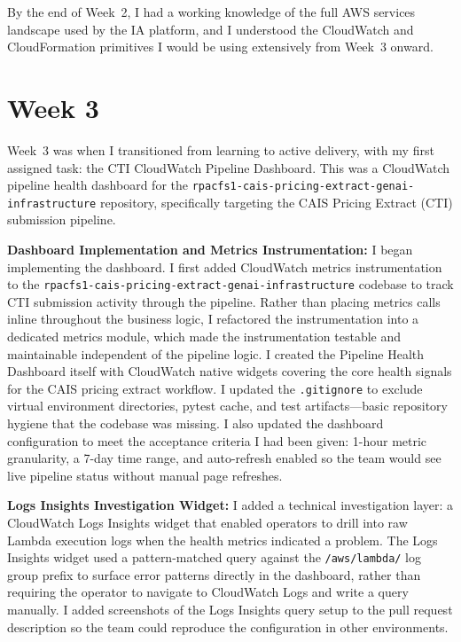 By the end of Week~2, I had a working knowledge of the full AWS services landscape used by the IA platform, and I understood the CloudWatch and CloudFormation primitives I would be using extensively from Week~3 onward.


\FloatBarrier

\section{Week 3}
\label{sec:week3}

Week~3 was when I transitioned from learning to active delivery, with my first assigned task: the CTI CloudWatch Pipeline Dashboard. This was a CloudWatch pipeline health dashboard for the \texttt{rpacfs1-cais-pricing-\allowbreak{}extract-genai-infrastructure} repository, specifically targeting the CAIS Pricing Extract (CTI) submission pipeline.

\textbf{Dashboard Implementation and Metrics Instrumentation:}
I began implementing the dashboard. I first added CloudWatch metrics instrumentation to the \texttt{rpacfs1-cais-pricing-\allowbreak{}extract-genai-infrastructure} codebase to track CTI submission activity through the pipeline. Rather than placing metrics calls inline throughout the business logic, I refactored the instrumentation into a dedicated metrics module, which made the instrumentation testable and maintainable independent of the pipeline logic. I created the Pipeline Health Dashboard itself with CloudWatch native widgets covering the core health signals for the CAIS pricing extract workflow. I updated the \texttt{.gitignore} to exclude virtual environment directories, pytest cache, and test artifacts---basic repository hygiene that the codebase was missing. I also updated the dashboard configuration to meet the acceptance criteria I had been given: 1-hour metric granularity, a 7-day time range, and auto-refresh enabled so the team would see live pipeline status without manual page refreshes.

\textbf{Logs Insights Investigation Widget:}
I added a technical investigation layer: a CloudWatch Logs Insights widget that enabled operators to drill into raw Lambda execution logs when the health metrics indicated a problem. The Logs Insights widget used a pattern-matched query against the \texttt{/aws/lambda/} log group prefix to surface error patterns directly in the dashboard, rather than requiring the operator to navigate to CloudWatch Logs and write a query manually. I added screenshots of the Logs Insights query setup to the pull request description so the team could reproduce the configuration in other environments.

